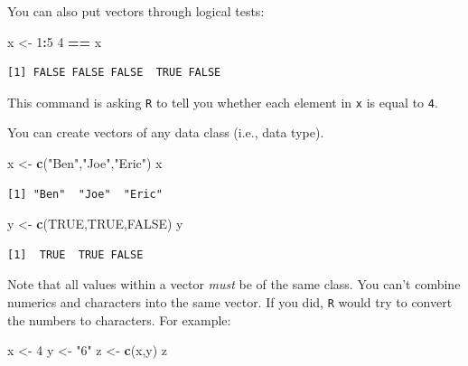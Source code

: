\documentclass[
]{book}
\newenvironment{Shaded}{\begin{snugshade}}{\end{snugshade}}
\newcommand{\DecValTok}[1]{\textcolor[rgb]{0.00,0.00,0.81}{#1}}
\newcommand{\KeywordTok}[1]{\textcolor[rgb]{0.13,0.29,0.53}{\textbf{#1}}}
\newcommand{\NormalTok}[1]{#1}
\newcommand{\OperatorTok}[1]{\textcolor[rgb]{0.81,0.36,0.00}{\textbf{#1}}}
\newcommand{\OtherTok}[1]{\textcolor[rgb]{0.56,0.35,0.01}{#1}}
\newcommand{\StringTok}[1]{\textcolor[rgb]{0.31,0.60,0.02}{#1}}
\begin{document}
You can also put vectors through logical tests:

\begin{Shaded}
\begin{Highlighting}[]
\NormalTok{x <-}\StringTok{ }\DecValTok{1}\OperatorTok{:}\DecValTok{5}
\DecValTok{4} \OperatorTok{==}\StringTok{ }\NormalTok{x}
\end{Highlighting}
\end{Shaded}

\begin{verbatim}
[1] FALSE FALSE FALSE  TRUE FALSE
\end{verbatim}

This command is asking \texttt{R} to tell you whether each element in \texttt{x} is equal to \texttt{4}.

You can create vectors of any data class (i.e., data type).

\begin{Shaded}
\begin{Highlighting}[]
\NormalTok{x <-}\StringTok{ }\KeywordTok{c}\NormalTok{(}\StringTok{"Ben"}\NormalTok{,}\StringTok{"Joe"}\NormalTok{,}\StringTok{"Eric"}\NormalTok{) }
\NormalTok{x}
\end{Highlighting}
\end{Shaded}

\begin{verbatim}
[1] "Ben"  "Joe"  "Eric"
\end{verbatim}

\begin{Shaded}
\begin{Highlighting}[]
\NormalTok{y <-}\StringTok{ }\KeywordTok{c}\NormalTok{(}\OtherTok{TRUE}\NormalTok{,}\OtherTok{TRUE}\NormalTok{,}\OtherTok{FALSE}\NormalTok{)}
\NormalTok{y}
\end{Highlighting}
\end{Shaded}

\begin{verbatim}
[1]  TRUE  TRUE FALSE
\end{verbatim}

Note that all values within a vector \emph{must} be of the same class. You can't combine numerics and characters into the same vector. If you did, \texttt{R} would try to convert the numbers to characters. For example:

\begin{Shaded}
\begin{Highlighting}[]
\NormalTok{x <-}\StringTok{ }\DecValTok{4}
\NormalTok{y <-}\StringTok{ "6"}
\NormalTok{z <-}\StringTok{ }\KeywordTok{c}\NormalTok{(x,y)}
\NormalTok{z}
\end{Highlighting}
\end{Shaded}
\end{document}
